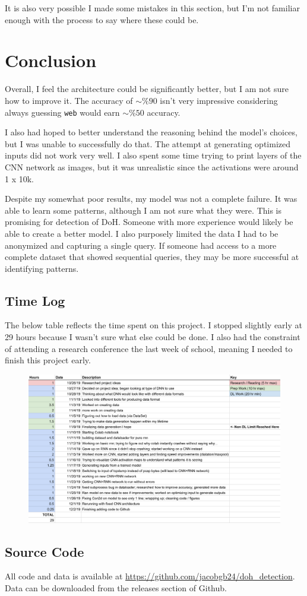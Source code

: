 \documentclass[fleqn,11pt]{article}
\begin{document}
It is also very possible I made some mistakes in this section, but I'm not familiar enough with the process to say where these could be.

\section{Conclusion}
Overall, I feel the architecture could be significantly better, but I am not sure how to improve it.
The accuracy of $\sim\%90$ isn't very impressive considering always guessing \texttt{web} would earn $\sim\%50$ accuracy.

I also had hoped to better understand the reasoning behind the model's choices, but I was unable to successfully do that.
The attempt at generating optimized inputs did not work very well.
I also spent some time trying to print layers of the CNN network as images, but it was unrealistic since the activations were around 1 x 10k.

Despite my somewhat poor results, my model was not a complete failure.
It was able to learn some patterns, although I am not sure what they were.
This is promising for detection of DoH.
Someone with more experience would likely be able to create a better model.
I also purposely limited the data I had to be anonymized and capturing a single query. 
If someone had access to a more complete dataset that showed sequential queries, they may be more successful at identifying patterns.


\subsection{Time Log}
The below table reflects the time spent on this project. I stopped slightly early at 29 hours because I wasn't sure what else could be done. 
I also had the constraint of attending a research conference the last week of school, meaning I needed to finish this project early.
\smallskip

\begin{figure}[H]
    \centering
    \includegraphics[width=.95\linewidth]{log.png}
\end{figure}

\subsection{Source Code}
All code and data is available at \url{https://github.com/jacobgb24/doh_detection}.\\
Data can be downloaded from the releases section of Github.
\end{document}
